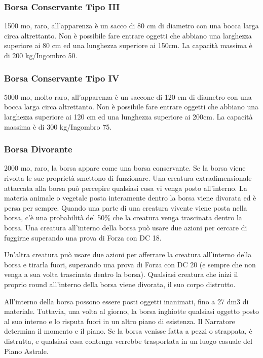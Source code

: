 \begin{multicols}{2}
	\subsubsection*{Borsa Conservante Tipo III}
	1500 mo, raro, all'apparenza è un sacco di 80 cm di diametro con una bocca larga circa altrettanto.
	Non è possibile fare entrare oggetti che abbiano una larghezza superiore ai 80 cm ed una lunghezza superiore ai 150cm. La capacità massima è di 200 kg/Ingombro 50.

	\subsubsection*{Borsa Conservante Tipo IV}
	5000 mo, molto raro, all'apparenza è un saccone di 120 cm di diametro con una bocca larga circa altrettanto.
	Non è possibile fare entrare oggetti che abbiano una larghezza superiore ai 120 cm ed una lunghezza superiore ai 200cm. La capacità massima è di 300 kg/Ingombro 75.

	\subsubsection*{Borsa Divorante}
	2000 mo, raro, la borsa appare come una borsa conservante. Se la borsa viene rivolta le sue proprietà smettono di funzionare. Una creatura extradimensionale attaccata alla borsa può percepire qualsiasi cosa vi venga posto all'interno. La materia animale o vegetale posta interamente dentro la borsa viene divorata ed è persa per sempre. Quando una parte di una creatura vivente viene posta nella borsa, c'è una probabilità del 50\% che la creatura venga trascinata dentro la borsa. Una creatura all'interno della borsa può usare due azioni per cercare di fuggirne superando una prova di Forza con DC 18.

	Un'altra creatura può usare due azioni per afferrare la creatura all'interno della borsa e tirarla fuori, superando una prova di Forza con DC 20 (e sempre che non venga a sua volta trascinata dentro la borsa). Qualsiasi creatura che inizi il proprio round all'interno della borsa viene divorata, il suo corpo distrutto.

	All'interno della borsa possono essere posti oggetti inanimati, fino a 27 dm3 di materiale. Tuttavia, una volta al giorno, la borsa inghiotte qualsiasi oggetto posto al suo interno e lo risputa fuori in un altro piano di esistenza. Il Narratore determina il momento e il piano. Se la borsa venisse fatta a pezzi o strappata, è distrutta, e qualsiasi cosa contenga verrebbe trasportata in un luogo casuale del Piano Astrale.


\end{multicols}
